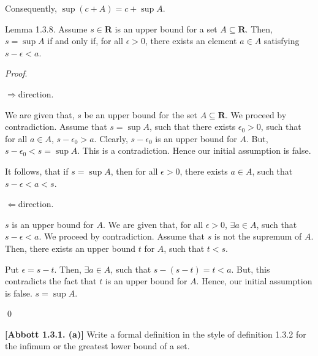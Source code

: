\documentclass[10pt]{article}
\begin{document}
Consequently, $\displaystyle \sup ( c+A) =c+\sup A$.



Lemma 1.3.8. Assume $\displaystyle s\in \mathbf{R}$ is an upper bound for a set $\displaystyle A\subseteq \mathbf{R}$. Then, $\displaystyle s=\sup A$ if and only if, for all $\displaystyle \epsilon  >0$, there exists an element $\displaystyle a\in A$ satisfying $\displaystyle s-\epsilon < a$.



\textit{Proof}.



$\displaystyle \Longrightarrow $direction.

We are given that, $\displaystyle s$ be an upper bound for the set $\displaystyle A\subseteq \mathbf{R}$. We proceed by contradiction. Assume that $\displaystyle s=\sup A$, such that there exists $\displaystyle \epsilon _{0}  >0$, such that for all $\displaystyle a\in A$, $\displaystyle s-\epsilon _{0}  >a$. Clearly, $\displaystyle s-\epsilon _{0}$ is an upper bound for $\displaystyle A$. But, $\displaystyle s-\epsilon _{0} < s=\sup A$. This is a contradiction. Hence our initial assumption is false. 



It follows, that if $\displaystyle s=\sup A$, then for all $\displaystyle \epsilon  >0$, there exists $\displaystyle a\in A$, such that $\displaystyle s-\epsilon < a< s$.



$\displaystyle \Longleftarrow $direction.

$\displaystyle s$ is an upper bound for $\displaystyle A$. We are given that, for all $\displaystyle \epsilon  >0$, $\displaystyle \exists a\in A$, such that $\displaystyle s-\epsilon < a$. We proceed by contradiction. Assume that $\displaystyle s$ is not the supremum of $\displaystyle A$. Then, there exists an upper bound $\displaystyle t$ for $\displaystyle A$, such that $\displaystyle t< s$.



Put $\displaystyle \epsilon =s-t$. Then, $\displaystyle \exists a\in A$, such that $\displaystyle s-( s-t) =t< a$. But, this contradicts the fact that $\displaystyle t$ is an upper bound for $\displaystyle A$. Hence, our initial assumption is false. $\displaystyle s=\sup A$.

\qed 

\textbf{[Abbott 1.3.1. (a)] }Write a formal definition in the style of definition 1.3.2 for the infimum or the greatest lower bound of a set.
\end{document}
